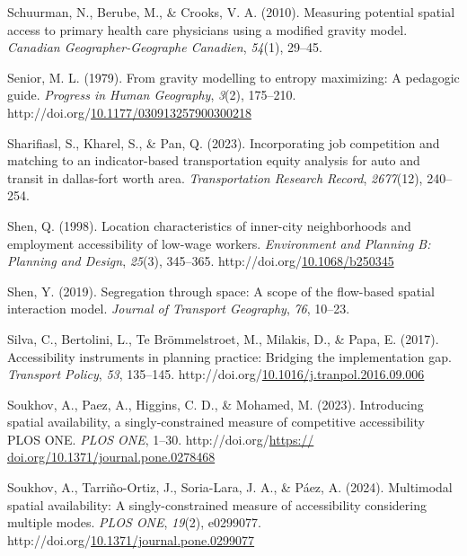 \documentclass[
11pt, %
oneside, %
english, %
singlespacing, %
]{macthesis} %
\newlength{\cslhangindent}
\newenvironment{CSLReferences}[2] %
{\begin{list}{}{%
	\setlength{\itemindent}{0pt}
	\setlength{\leftmargin}{0pt}
	\setlength{\parsep}{0pt}
	\ifodd #1
	\setlength{\leftmargin}{\cslhangindent}
	\setlength{\itemindent}{-1\cslhangindent}
	\fi
	\setlength{\itemsep}{#2\baselineskip}}}
{\end{list}}
\begin{document}
\begin{CSLReferences}{1}{0}
Schuurman, N., Berube, M., \& Crooks, V. A. (2010). Measuring potential spatial access to primary health care physicians using a modified gravity model. \emph{Canadian Geographer-Geographe Canadien}, \emph{54}(1), 29--45.

Senior, M. L. (1979). From gravity modelling to entropy maximizing: A pedagogic guide. \emph{Progress in Human Geography}, \emph{3}(2), 175--210. http://doi.org/\href{https://doi.org/10.1177/030913257900300218}{10.1177/030913257900300218}

Sharifiasl, S., Kharel, S., \& Pan, Q. (2023). Incorporating job competition and matching to an indicator-based transportation equity analysis for auto and transit in dallas-fort worth area. \emph{Transportation Research Record}, \emph{2677}(12), 240--254.

Shen, Q. (1998). Location characteristics of inner-city neighborhoods and employment accessibility of low-wage workers. \emph{Environment and Planning B: Planning and Design}, \emph{25}(3), 345--365. http://doi.org/\href{https://doi.org/10.1068/b250345}{10.1068/b250345}

Shen, Y. (2019). Segregation through space: A scope of the flow-based spatial interaction model. \emph{Journal of Transport Geography}, \emph{76}, 10--23.

Silva, C., Bertolini, L., Te Brömmelstroet, M., Milakis, D., \& Papa, E. (2017). Accessibility instruments in planning practice: Bridging the implementation gap. \emph{Transport Policy}, \emph{53}, 135--145. http://doi.org/\href{https://doi.org/10.1016/j.tranpol.2016.09.006}{10.1016/j.tranpol.2016.09.006}

Soukhov, A., Paez, A., Higgins, C. D., \& Mohamed, M. (2023). Introducing spatial availability, a singly-constrained measure of competitive accessibility {\textbar} {PLOS} {ONE}. \emph{{PLOS} {ONE}}, 1--30. http://doi.org/\href{https://\%20doi.org/10.1371/journal.pone.0278468}{https:// doi.org/10.1371/journal.pone.0278468}

Soukhov, A., Tarriño-Ortiz, J., Soria-Lara, J. A., \& Páez, A. (2024). Multimodal spatial availability: A singly-constrained measure of accessibility considering multiple modes. \emph{{PLOS} {ONE}}, \emph{19}(2), e0299077. http://doi.org/\href{https://doi.org/10.1371/journal.pone.0299077}{10.1371/journal.pone.0299077}


\end{CSLReferences}
\end{document}
